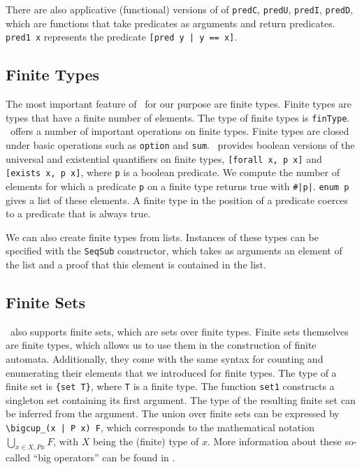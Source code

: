 

There are also applicative (functional) versions of of \lstinline{predC}, \lstinline{predU}, \lstinline{predI}, \lstinline{predD}, 
which are functions that take predicates as arguments and return predicates.
\lstinline{pred1 x} represents the predicate \lstinline{[pred y | y == x]}.

\subsection{Finite Types} %
The most important feature of \ssreflect\ for our purpose are finite types.  
Finite types are types that have a finite number of elements.
The type of finite types is \lstinline{finType}.
\ssreflect\ offers a number of important operations on finite types.
Finite types are closed under basic operations such as \lstinline{option} and \lstinline{sum}.
\ssreflect\ provides boolean versions of the universal and existential quantifiers on finite types, \lstinline{[forall x, p x]} and \lstinline{[exists x, p x]},
where \lstinline{p} is a boolean predicate.
We compute the number of elements for which a predicate \lstinline{p} on a finite type returns true with \lstinline{#|p|}.
\lstinline{enum p} gives a list of these elements.
A finite type in the position of a predicate coerces to a predicate that is always true.

We can also create finite types from lists.
Instances of these types can be specified with the \lstinline{SeqSub} constructor, 
which takes as arguments an element of the list and a proof that this element is contained in the list.

\subsection{Finite Sets}
\ssreflect\ also supports finite sets, which are sets over finite types.
Finite sets themselves are finite types, which allows us to use them in the construction of finite automata.
Additionally, they come with the same syntax for counting and enumerating their elements that we introduced for finite types.
The type of a finite set is \lstinline!{set T}!, where \lstinline{T} is a finite type.
The function \lstinline{set1} constructs a singleton set containing its first argument. 
The type of the resulting finite set can be inferred from the argument. 
The union over finite sets can be expressed by \lstinline{\bigcup_(x | P x) F}, 
which corresponds to the mathematical notation $\bigcup_{x \in X, P x} F$, with $X$ being the (finite) type of $x$.
More information about these so-called ``big operators'' can be found in \cite{bertot:inria-00331193}.



